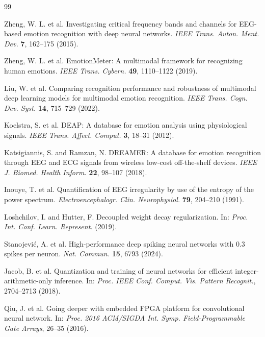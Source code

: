 ﻿\documentclass[12pt]{article}
\begin{document}
\begin{thebibliography}{99}

Zheng, W. L. et al.
Investigating critical frequency bands and channels for EEG-based emotion recognition with deep neural networks.
\textit{IEEE Trans. Auton. Ment. Dev.} \textbf{7}, 162--175 (2015).

Zheng, W. L. et al.
EmotionMeter: A multimodal framework for recognizing human emotions.
\textit{IEEE Trans. Cybern.} \textbf{49}, 1110--1122 (2019).

Liu, W. et al.
Comparing recognition performance and robustness of multimodal deep learning models for multimodal emotion recognition.
\textit{IEEE Trans. Cogn. Dev. Syst.} \textbf{14}, 715--729 (2022).

Koelstra, S. et al.
DEAP: A database for emotion analysis using physiological signals.
\textit{IEEE Trans. Affect. Comput.} \textbf{3}, 18--31 (2012).

Katsigiannis, S. and Ramzan, N.
DREAMER: A database for emotion recognition through EEG and ECG signals from wireless low-cost off-the-shelf devices.
\textit{IEEE J. Biomed. Health Inform.} \textbf{22}, 98--107 (2018).

Inouye, T. et al.
Quantification of EEG irregularity by use of the entropy of the power spectrum.
\textit{Electroencephalogr. Clin. Neurophysiol.} \textbf{79}, 204--210 (1991).

Loshchilov, I. and Hutter, F.
Decoupled weight decay regularization.
In: \textit{Proc. Int. Conf. Learn. Represent.} (2019).

Stanojevi\'{c}, A. et al.
High-performance deep spiking neural networks with 0.3 spikes per neuron.
\textit{Nat. Commun.} \textbf{15}, 6793 (2024).

Jacob, B. et al.
Quantization and training of neural networks for efficient integer-arithmetic-only inference.
In: \textit{Proc. IEEE Conf. Comput. Vis. Pattern Recognit.}, 2704--2713 (2018).

Qiu, J. et al.
Going deeper with embedded FPGA platform for convolutional neural network.
In: \textit{Proc. 2016 ACM/SIGDA Int. Symp. Field-Programmable Gate Arrays}, 26--35 (2016).

\end{thebibliography}
\end{document}
